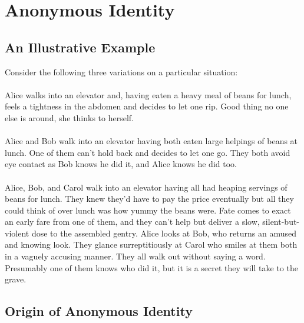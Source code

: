 \documentclass[pra,twocolumn,groupedaddress,10pt]{revtex4}
\theoremstyle{definition}
\begin{document}
\section{Anonymous Identity} \label{sec:anoide}

\subsection{An Illustrative Example} \label{sec:illexa}

Consider the following three variations on a particular situation:

\paragraph{}

Alice walks into an elevator and, having eaten a heavy meal of beans for lunch, feels a tightness in the abdomen and decides to let one rip. Good thing no one else is around, she thinks to herself.

\paragraph{}

Alice and Bob walk into an elevator having both eaten large helpings of beans at lunch. One of them can't hold back and decides to let one go. They both avoid eye contact as Bob knows he did it, and Alice knows he did too.

\paragraph{}

Alice, Bob, and Carol walk into an elevator having all had heaping servings of beans for lunch. They knew they'd have to pay the price eventually but all they could think of over lunch was how yummy the beans were. Fate comes to exact an early fare from one of them, and they can't help but deliver a slow, silent-but-violent dose to the assembled gentry. Alice looks at Bob, who returns an amused and knowing look. They glance surreptitiously at Carol who smiles at them both in a vaguely accusing manner. They all walk out without saying a word. Presumably one of them knows who did it, but it is a secret they will take to the grave.

\subsection{Origin of Anonymous Identity} \label{sec:orianoide}
\end{document}
